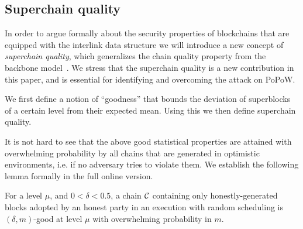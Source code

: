 %




\subsection{Superchain quality}
In order to argue formally about the security
properties of blockchains that are equipped with the interlink
data structure we will introduce a new concept of {\em superchain quality},
which generalizes the chain quality property from the backbone model~\cite{backbone}.
We stress that the superchain quality is a new contribution in this paper, and is essential for identifying and overcoming the attack on PoPoW.

We first define a notion of ``goodness'' that bounds the deviation
of superblocks of a certain level from their expected mean. Using
this we then define superchain quality.

It is not hard to see that the above good statistical properties are attained
with overwhelming probability by all chains that are generated in optimistic
environments, i.e. if no adversary tries to violate them.
We establish the following lemma formally in the full online version.
\begin{lemma}
\label{lem.superchain-distribution}
For a level $\mu$, and $0 < \delta < 0.5$, a chain
$\mathcal{C}$ containing only honestly-generated blocks adopted by an honest party in
an execution with random scheduling is $(\delta, m)$-good at level
$\mu$ with overwhelming probability in $m$.
\end{lemma}

